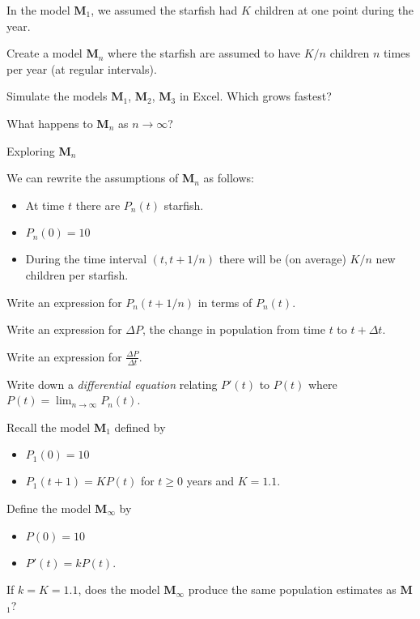 \documentclass{workbook}
\begin{document}
\begin{slide}
	\question
	In the model \textbf{M$_1$}, we assumed the starfish had $K$ children at one point during the year.

	\begin{parts}
		\item Create a model \textbf{M$_n$} where the starfish are assumed to have $K/n$ children $n$ times per year (at regular intervals).
		\item Simulate the models \textbf{M$_1$}, \textbf{M$_2$}, \textbf{M$_3$} in Excel. Which grows fastest?
		\item What happens to \textbf{M$_n$} as $n\to\infty$?
	\end{parts}

\end{slide}

\begin{slide}
	\question
	Exploring \textbf{M$_n$}

	We can rewrite the assumptions of \textbf{M$_n$} as follows:
	\begin{itemize}
		\item At time $t$ there are $P_n(t)$ starfish.
		\item $P_n(0)=10$
		\item During the time interval $(t, t+1/n)$ there will be (on average) $K/n$ new children per starfish.
	\end{itemize}

	\begin{parts}
		\item Write an expression for $P_n(t+1/n)$ in terms of $P_n(t)$.
		\item Write an expression for $\Delta P$, the change in population from time $t$ to $t+\Delta t$.
		\item Write an expression for $\frac{\Delta P}{\Delta t}$.
		\item Write down a \emph{differential equation} relating $P'(t)$ to $P(t)$ where $\displaystyle P(t)=\lim_{n\to\infty} P_n(t)$.
	\end{parts}
\end{slide}

\begin{slide}
	\question
	Recall the model \textbf{M$_1$} defined by
	\begin{itemize}
		\item $P_1(0)=10$
		\item $P_1(t+1) = KP(t)$ for $t\geq 0$ years and $K=1.1$.
	\end{itemize}
	Define the model \textbf{M$_\infty$} by
	\begin{itemize}
		\item $P(0)=10$
		\item $P'(t) = kP(t)$.
	\end{itemize}


	\begin{parts}
		\item If $k=K=1.1$, does the model \textbf{M$_\infty$} produce the same population estimates as \textbf{M$_1$}?
	\end{parts}

	\vspace*{1in}
\end{slide}
\end{document}
